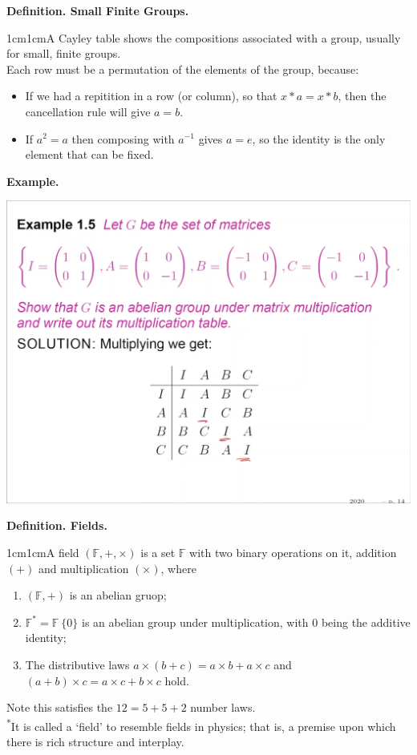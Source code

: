 \documentclass{article}
\newcommand{\definition}[2]{\textbf{Definition. #1.}\begin{adjustwidth}{1cm}{1cm}#2\end{adjustwidth}}
\begin{document}
\definition{Small Finite Groups}{A Cayley table shows the compositions associated with a group, usually for small, finite groups.\\[1\baselineskip]Each row must be a permutation of the elements of the group, because:
\begin{itemize}
  \item If we had a repitition in a row (or column), so that $x*a = x*b$, then the cancellation rule will give $a = b$.
  \item If $a^2 = a$ then composing with $a^{-1}$ gives $a = e$, so the identity is the only element that can be fixed.
\end{itemize}}
\textbf{Example.}
\begin{center}
  \includegraphics[scale=0.25]{assets/group_example.png}
\end{center}
\definition{Fields}{A field $(\mathbb{F}, +, \times)$ is a set $\mathbb{F}$ with two binary operations on it, addition $(+)$ and multiplication $(\times)$, where\begin{enumerate}\item $(\mathbb{F}, +)$ is an abelian gruop;\item $\mathbb{F}^* = \mathbb{F} \ \{0\}$ is an abelian group under multiplication, with $0$ being the additive identity;\item The distributive laws $a \times (b + c) = a \times b + a \times c$ and $(a + b) \times c = a \times c + b \times c$ hold.\end{enumerate}Note this satisfies the $12=5 + 5 + 2$ number laws.\\[1\baselineskip]\textsuperscript{*}It is called a `field' to resemble fields in physics; that is, a premise upon which there is rich structure and interplay.}~\\
\end{document}
